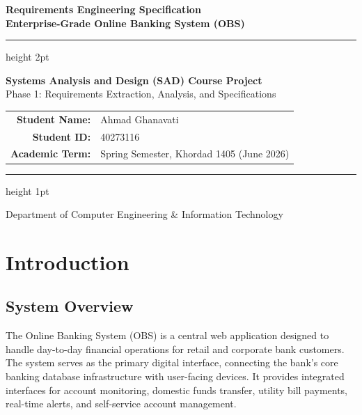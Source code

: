 \documentclass[11pt,a4paper]{article}
\begin{document}
\begin{titlepage}
    \centering
    \vspace*{2cm}
    
    {\color{primaryblue}\fontsize{26}{32}\selectfont \textbf{Requirements Engineering Specification}} \\[0.5cm]
    {\color{secondaryblue}\fontsize{18}{22}\selectfont \textbf{Enterprise-Grade Online Banking System (OBS)}} \\[1.5cm]
    
    {\color{primaryblue}\hrule height 2pt}
    \vspace{1.5cm}
    
    {\fontsize{14}{18}\selectfont \textbf{Systems Analysis and Design (SAD) Course Project}} \\
    {\fontsize{12}{15}\selectfont Phase 1: Requirements Extraction, Analysis, and Specifications} \\[3cm]
    
    \begin{minipage}{0.6\textwidth}
        \centering
        \doublespacing
        \begin{tabular}{rl}
            \textbf{Student Name:} & Ahmad Ghanavati \\
            \textbf{Student ID:} & 40273116 \\
            \textbf{Academic Term:} & Spring Semester, Khordad 1405 (June 2026) \\
        \end{tabular}
    \end{minipage}
    
    \vfill
    {\color{bordergray}\hrule height 1pt}
    \vspace{0.5cm}
    {\color{darkgray}\small Department of Computer Engineering \& Information Technology}
    \vspace*{1cm}
\end{titlepage}

\newpage
\tableofcontents
\newpage

\section{Introduction}

\subsection{System Overview}
The Online Banking System (OBS) is a central web application designed to handle day-to-day financial operations for retail and corporate bank customers. The system serves as the primary digital interface, connecting the bank's core banking database infrastructure with user-facing devices. It provides integrated interfaces for account monitoring, domestic funds transfer, utility bill payments, real-time alerts, and self-service account management.
\end{document}
